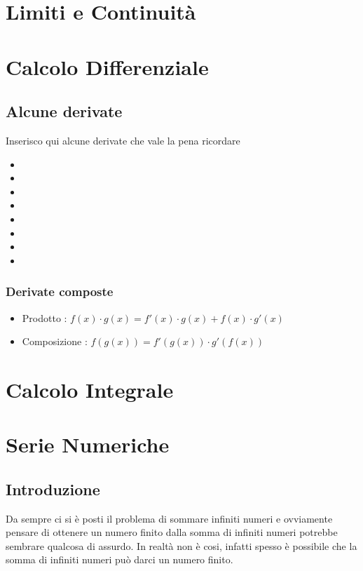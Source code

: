 \documentclass[12pt, a4paper, openany]{book}
\begin{document}
\chapter{Limiti e Continuità}
\chapter{Calcolo Differenziale}
\section{Alcune derivate}
Inserisco qui alcune derivate che vale la pena ricordare
\begin{itemize}
    \item {}
    \item {}
    \item {}
    \item {}
    \item {}
    \item {}
    \item {}
    \item {}
\end{itemize}
\subsection{Derivate composte}
\begin{itemize}
    \item Prodotto : $f(x) \cdot g(x) = f'(x) \cdot g(x) + f(x) \cdot g'(x)$
    \item Composizione : $f(g(x)) = f'(g(x)) \cdot g'(f(x))$
\end{itemize}
\chapter{Calcolo Integrale}
\chapter{Serie Numeriche}
\section{Introduzione}
Da sempre ci si è posti il problema di sommare infiniti numeri e ovviamente pensare di ottenere un numero finito dalla somma di infiniti numeri potrebbe sembrare qualcosa di assurdo.
In realtà non è cosi, infatti spesso è possibile che la somma di infiniti numeri può darci un numero finito.
\end{document}
